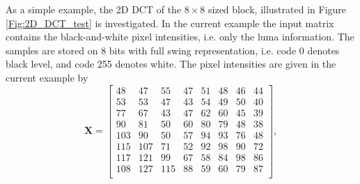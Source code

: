 As a simple example, the 2D DCT of the $8\times 8$ sized block, illustrated in Figure \ref{Fig:2D_DCT_test} is investigated.
In the current example the input matrix contains the black-and-white pixel intensities, i.e. only the luma information.
The samples are stored on 8 bits with full swing representation, i.e. code 0 denotes black level, and code 255 denotes white.
The pixel intensities are given in the current example by 
\begin{equation}
\mathbf{X} =  \begin{bmatrix}
       48  &  47  &  55 &   47  &  51 &   48 &   46  &  44  \\[0.3em]
       53  &  53  &  47 &   43  &  54 &   49 &   50  &  40  \\[0.3em]
       77  &  67  &  43 &   47  &  62 &   60 &   45  &  39  \\[0.3em]
       90  &  81  &  50 &   60  &  80 &   79 &   48  &  38 \\[0.3em] 
       103  &  90  &  50 &  57  &  94 &   93 &   76  &  48 \\[0.3em]
       115  & 107  &  71  &  52  &  92 &   98  &  90  &  72 \\[0.3em]
       117  & 121  &  99  &  67  &  58 &   84  &  98  &  86 \\[0.3em]
       108  & 127 &  115  &  88  &  59 &   60  &  79 &   87 \\[0.3em]
       \end{bmatrix}, 
\end{equation}


